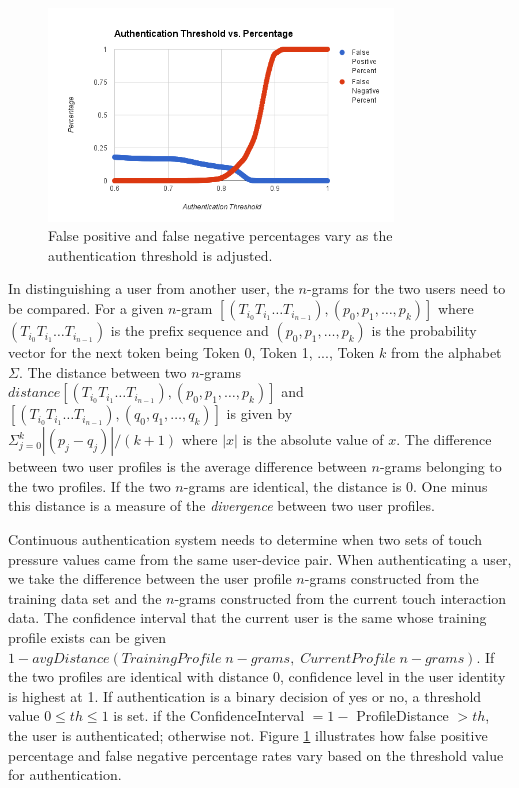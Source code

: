 \documentclass{acm_proc_article-sp}
\begin{document}
\begin{figure}
\centering
\includegraphics[width=3.6in]{threshold_vs_percentages.png}
\caption{False positive and false negative percentages vary as the authentication threshold is adjusted.}
\label{fig:threshold_vs_percentages}
\end{figure}

In distinguishing a user from another user, the $n$-grams for the two users need to be compared. 
For a given $n$-gram $[(T_{i_0} T_{i_1} \dots T_{i_{n-1}}), (p_0, p_1, \dots, p_k)]$ where 
$(T_{i_0} T_{i_1} \dots T_{i_{n-1}})$ is the prefix sequence and $(p_0, p_1, \dots, p_k)$ is the
probability vector for the next token being Token 0, Token 1, ..., Token $k$ from the alphabet $\Sigma$.
The distance between two $n$-grams $distance[(T_{i_0} T_{i_1} \dots T_{i_{n-1}}), (p_0, p_1, \dots, p_k)]$
and \\
$[(T_{i_0} T_{i_1} \dots T_{i_{n-1}}), (q_0, q_1, \dots, q_k)]$ is
given by \\
$\Sigma_{j=0}^k|(p_j - q_j)|/(k+1)$ where $|x|$ is the absolute value of $x$.
The difference between two user profiles is the average difference between $n$-grams belonging
to the two profiles. If the two $n$-grams are identical, the distance is 0.
One minus this distance is a measure of the {\it divergence} between two user profiles.

Continuous authentication system needs to determine when two sets of touch pressure values came from the same user-device pair. When authenticating a user, we take the difference between
the user profile $n$-grams constructed from the training data set and the $n$-grams
constructed from the current touch interaction data. The confidence interval
that the current user is the same whose training profile exists can be given $1 - 
avgDistance(TrainingProfile \; n-grams, \; CurrentProfile \; n-grams)$. If the two profiles are
identical with distance 0, confidence level in the user identity is highest at 1.
%
If authentication is a binary decision of yes or no, a threshold value $0 \leq th \leq 1$ is set.
if the ConfidenceInterval $= 1 -$ ProfileDistance $> th$, the user is authenticated; otherwise not. 
Figure \ref{fig:threshold_vs_percentages} illustrates how false positive percentage and false negative percentage rates vary based on the threshold value for authentication. 
\end{document}
